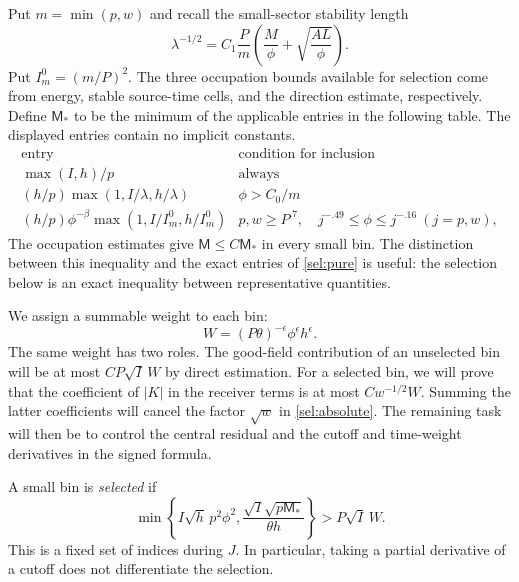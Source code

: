 Put $m=\min(p,w)$ and recall the small-sector stability length
\begin{equation}\label{sel:lambda}
 \lambda^{-1/2}
 =C_1\frac Pm\left(\frac M\phi+\sqrt{\frac{AL}{\phi}}\right).
\end{equation}
Put $I_m^0=(m/P)^2$. The three occupation bounds available for selection
come from energy, stable source-time cells, and the direction estimate,
respectively. Define $\mathsf M_*$ to be the minimum of the applicable
entries in the following table. The displayed entries contain no implicit
constants.
\begin{equation}\label{sel:pure}
\begin{array}{c|l}
 \text{entry}&\text{condition for inclusion}\\ \hline
 \max(I,h)/p&\text{always}\\[2pt]
 (h/p)\max(1,I/\lambda,h/\lambda)&\phi>C_0/m\\[2pt]
 (h/p)\phi^{-\beta}\max(1,I/I_m^0,h/I_m^0)
 &p,w\ge P^{.7},\quad
   j^{-.49}\le\phi\le j^{-.16}\ (j=p,w),
\end{array}
\end{equation}
The occupation estimates give $\mathsf M\le C\mathsf M_*$ in every small
bin. The distinction between this inequality and the exact entries of
\eqref{sel:pure} is useful: the selection below is an exact inequality
between representative quantities.

We assign a summable weight to each bin:
\begin{equation}\label{sel:weight}
 W=(P\theta)^{-\epsilon}\phi^\epsilon h^\epsilon.
\end{equation}
The same weight has two roles. The good-field contribution of an
unselected bin will be at most $CP\sqrt I\,W$ by direct estimation. For a selected bin, we will prove
that the coefficient of $|K|$ in the receiver terms is at most
$Cw^{-1/2}W$. Summing the latter coefficients will cancel the factor
$\sqrt w$ in \eqref{sel:absolute}. The remaining task will then be to
control the central residual and the cutoff and time-weight derivatives
in the signed formula.

A small bin is \emph{selected} if
\begin{equation}\label{sel:selection}
 \min\left\{I\sqrt h\,p^2\phi^2,
       \frac{\sqrt I\sqrt{p\mathsf M_*}}{\theta h}\right\}
       >P\sqrt I\,W.
\end{equation}
This is a fixed set of indices during $J$. In particular, taking a
partial derivative of a cutoff does not differentiate the selection.

